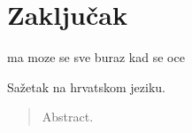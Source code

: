 \documentclass[times, utf8, diplomski]{fer}
\begin{document}
\chapter{Zaključak}
ma moze se sve buraz kad se oce




\begin{sazetak}
Sažetak na hrvatskom jeziku.

\end{sazetak}

\begin{abstract}
Abstract.

\end{abstract}
\end{document}
